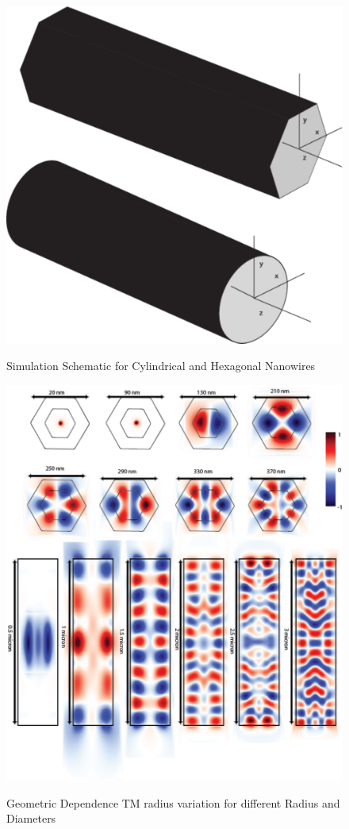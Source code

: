 \begin{figure}
  \caption{Simulation Schematic for Cylindrical and Hexagonal Nanowires}
  \centering
  \includegraphics[width=\textwidth]{pictures/LM/NW}
  \label{NW}
\end{figure}

\begin{figure}
  \caption{Geometric Dependence TM radius variation for different Radius and Diameters}
  \centering
  \includegraphics[width=\textwidth]{pictures/LM/TMradius}
  \label{TMradius}
\end{figure}

